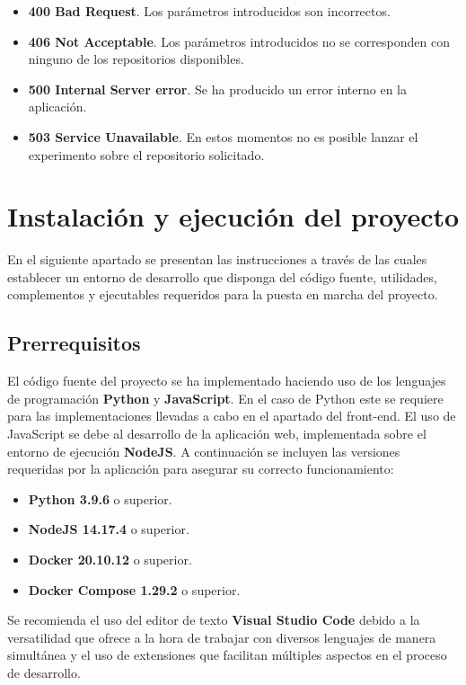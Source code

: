 \begin{itemize}
\begin{itemize}
            \item[] \textbf{400 Bad Request}. Los parámetros introducidos son incorrectos.
            \item[] \textbf{406 Not Acceptable}. Los parámetros introducidos no se corresponden con ninguno de los repositorios disponibles.
            \item[] \textbf{500 Internal Server error}. Se ha producido un error interno en la aplicación.
            \item[] \textbf{503 Service Unavailable}. En estos momentos no es posible lanzar el experimento sobre el repositorio solicitado.
        \end{itemize}
\end{itemize}

\section{Instalación y ejecución del proyecto}

En el siguiente apartado se presentan las instrucciones a través de las cuales establecer un entorno de desarrollo que disponga del código fuente, utilidades, complementos y ejecutables requeridos para la puesta en marcha del proyecto. 

\subsection{Prerrequisitos}
El código fuente del proyecto se ha implementado haciendo uso de los lenguajes de programación \textbf{Python} y \textbf{JavaScript}. En el caso de Python este se requiere para las implementaciones llevadas a cabo en el apartado del front-end. El uso de JavaScript se debe al desarrollo de la aplicación web, implementada sobre el entorno de ejecución \textbf{NodeJS}. A continuación se incluyen las versiones requeridas por la aplicación para asegurar su correcto funcionamiento:
\begin{itemize}
    \item \textbf{Python 3.9.6} o superior.
    \item \textbf{NodeJS 14.17.4} o superior.
    \item \textbf{Docker 20.10.12} o superior.
    \item \textbf{Docker Compose 1.29.2} o superior.
\end{itemize}
Se recomienda el uso del editor de texto \textbf{Visual Studio Code} debido a la versatilidad que ofrece a la hora de trabajar con diversos lenguajes de manera simultánea y el uso de extensiones que facilitan múltiples aspectos en el proceso de desarrollo.

